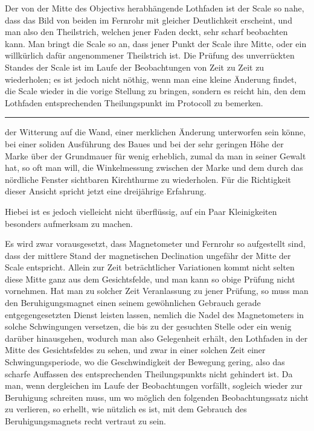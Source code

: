 Der von der Mitte des Objectivs herabhängende Lothfaden ist der Scale so nahe, dass das Bild von beiden im Fernrohr mit gleicher Deutlichkeit erscheint, und man also den Theilstrich, welchen jener Faden deckt, sehr scharf beobachten kann. Man bringt die Scale so an, dass jener Punkt der Scale ihre Mitte, oder ein willkürlich dafür angenommener Theilstrich ist. Die Prüfung des unverrückten Standes der Scale ist im Laufe der Beobachtungen von Zeit zu Zeit zu wiederholen; es ist jedoch nicht nöthig, wenn man eine kleine Änderung findet, die Scale wieder in die vorige Stellung zu bringen, sondern es reicht hin, den dem Lothfaden entsprechenden Theilungspunkt im Protocoll zu bemerken.
\par\vfill
\begingroup\footnotesize
\noindent\rule{.253\linewidth}{.35pt}\par
\nobreak\vspace{2mm}
\noindent der Witterung auf die Wand, einer merklichen Änderung unterworfen sein könne, bei einer soliden Ausführung des Baues und bei der sehr geringen Höhe der Marke über der Grundmauer für wenig erheblich, zumal da man in seiner Gewalt hat, so oft man will, die Winkelmessung zwischen der Marke und dem durch das nördliche Fenster sichtbaren Kirchthurme zu wiederholen. Für die Richtigkeit dieser Ansicht spricht jetzt eine dreijährige Erfahrung.
\par\endgroup

\par\clearpage
{}
Hiebei ist es jedoch vielleicht nicht überflüssig, auf ein Paar Kleinigkeiten besonders aufmerksam zu machen.

Es wird zwar vorausgesetzt, dass Magnetometer und Fernrohr so aufgestellt sind, dass der mittlere Stand der magnetischen Declination ungefähr der Mitte der Scale entspricht. Allein zur Zeit beträchtlicher Variationen kommt nicht selten diese Mitte ganz aus dem Gesichtsfelde, und man kann so obige Prüfung nicht vornehmen. Hat man zu solcher Zeit Veranlassung zu jener Prüfung, so muss man den Beruhigungsmagnet einen seinem gewöhnlichen Gebrauch gerade entgegengesetzten Dienst leisten lassen, nemlich die Nadel des Magnetometers in solche Schwingungen versetzen, die bis zu der gesuchten Stelle oder ein wenig darüber hinausgehen, wodurch man also Gelegenheit erhält, den Lothfaden in der Mitte des Gesichtsfeldes zu sehen, und zwar in einer solchen Zeit einer Schwingungsperiode, wo die Geschwindigkeit der Bewegung gering, also das scharfe Auffassen des entsprechenden Theilungspunkts nicht gehindert ist. Da man, wenn dergleichen im Laufe der Beobachtungen vorfällt, sogleich wieder zur Beruhigung schreiten muss, um wo möglich den folgenden Beobachtungssatz nicht zu verlieren, so erhellt, wie nützlich es ist, mit dem Gebrauch des Beruhigungsmagnets recht vertraut zu sein.


